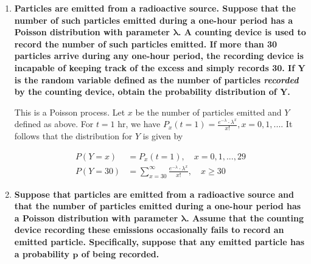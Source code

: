 \documentclass[10pt, oneside]{article}
\begin{document}
\begin{enumerate}[label=8.\arabic*]
\begin{align*}
E[aX+b] &= \sum^{10}_i (aX + b) P(x_i) \\
&= a \sum^{10}_i x_i P(x_i) + b \sum^{10}_i P(x_i)
\end{align*}

In cases where we do not consider all possible outcomes $x_i$, the constant term $b$ needs a "scaling" factor as above. Thus we can conclude that

\begin{align*}
E[\text{Profit}] &= 10 \sum^{10}_{D = 0} D \cdot \frac{e^{-8} \cdot 8^D}{D!} - 30 \sum^{10}_{D = 0} \frac{e^{-8} \cdot 8^D}{D!} \\
&\approx \boxed{\$32.85}
\end{align*}

\newpage
\item  \begin{tcolorbox}[
  colback=Cerulean!5!white,
  colframe=Cerulean!75!black]
\textbf{Particles are emitted from a radioactive source. Suppose that the number of such particles emitted during a one-hour period has a Poisson distribution with parameter $\bm{\lambda}$. A counting device is used to record the number of such particles emitted. If more than 30 particles arrive during any one-hour period, the recording device is incapable of keeping track of the excess and simply records 30. If $\bm{Y}$ is the random variable defined as the number of particles \textit{recorded} by the counting device, obtain the probability distribution of $\bm{Y}$.}
\end{tcolorbox}

This is a Poisson process. Let $x$ be the number of particles emitted and $Y$ defined as above. For $t = 1$ hr, we have $P_x (t = 1) = \frac{e^{-\lambda} \cdot \lambda^x}{x!}, x = 0, 1, ...$. It follows that the distribution for $Y$ is given by

\begin{align*}
P(Y = x) &= P_x (t=1), \quad x = 0, 1, ..., 29 \\
P(Y = 30) &= \sum^{\infty}_{x = 30} \frac{e^{-\lambda} \cdot \lambda^x}{x!}, \quad x \geq 30
\end{align*}

\item  \begin{tcolorbox}[
  colback=Cerulean!5!white,
  colframe=Cerulean!75!black]
\textbf{Suppose that particles are emitted from a radioactive source and that the number of particles emitted during a one-hour period has a Poisson distribution with parameter $\bm{\lambda}$. Assume that the counting device recording these emissions occasionally fails to record an emitted particle. Specifically, suppose that any emitted particle has a probability $\bm{p}$ of being recorded.}
\end{tcolorbox}


\end{enumerate}
\end{document}
